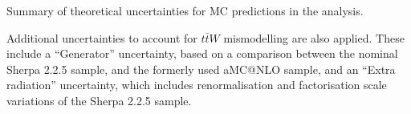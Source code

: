 \begin{table}[H]                                                                                                              {\footnotesize
\centering

\caption{Summary of theoretical uncertainties for MC predictions in the analysis.}
\label{tab:xsecUnc}}
\end{table}

Additional uncertainties to account for $t\bar{t}W$ mismodelling are also applied. These include a ``Generator'' uncertainty, based on a comparison between the nominal Sherpa 2.2.5 sample, and the formerly used aMC@NLO sample, and an ``Extra radiation'' uncertainty, which includes renormalisation and factorisation scale variations of the Sherpa 2.2.5 sample.
